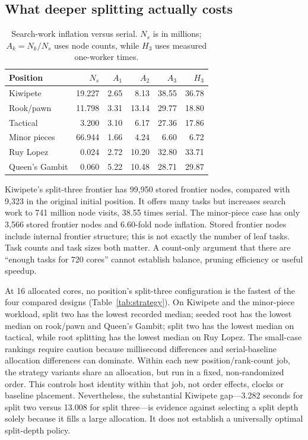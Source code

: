 \documentclass[11pt,a4paper]{article}
\begin{document}
\subsection{What deeper splitting actually costs}
\begin{table}[!htbp]\centering\small
\caption{Search-work inflation versus serial. $N_s$ is in millions;
$A_k=N_k/N_s$ uses node counts, while $H_3$ uses measured one-worker times.}
\label{tab:work}
\begin{tabular}{@{}lrrrrr@{}}\toprule
Position & $N_s$ & $A_1$ & $A_2$ & $A_3$ & $H_3$\\\midrule
Kiwipete & 19.227 & 2.65 & 8.13 & 38.55 & 36.78\\
Rook/pawn & 11.798 & 3.31 & 13.14 & 29.77 & 18.80\\
Tactical & 3.200 & 3.10 & 6.17 & 27.36 & 17.86\\
Minor pieces & 66.944 & 1.66 & 4.24 & 6.60 & 6.72\\
Ruy Lopez & 0.024 & 2.72 & 10.20 & 32.80 & 33.71\\
Queen's Gambit & 0.060 & 5.22 & 10.48 & 28.71 & 29.87\\
\bottomrule\end{tabular}\end{table}

Kiwipete's split-three frontier has 99,950 stored frontier nodes, compared with
9,323 in the original initial position. It offers many tasks but increases
search work to 741 million node visits, 38.55 times serial. The minor-piece
case has only 3,566 stored frontier nodes and 6.60-fold node inflation.
Stored frontier nodes include internal frontier structure; this is not exactly
the number of leaf tasks. Task counts and task sizes both matter. A count-only
argument that there are ``enough tasks for 720 cores'' cannot establish balance,
pruning efficiency or useful speedup.

At 16 allocated cores, no position's split-three configuration is the fastest
of the four compared designs (Table~\ref{tab:strategy}). On Kiwipete and the
minor-piece workload, split two has the lowest recorded median; seeded root has the lowest median
on rook/pawn and Queen's Gambit; split two has the lowest median on tactical,
while root splitting has the lowest median on Ruy Lopez. The small-case rankings require caution because millisecond differences
and serial-baseline allocation differences can dominate. Within each new
position/rank-count job, the strategy variants share an allocation, but run in
a fixed, non-randomized order. This controls host identity within that job, not
order effects, clocks or baseline placement. Nevertheless, the substantial
Kiwipete gap---3.282 seconds for split two versus 13.008 for split three---is evidence against selecting a split depth solely because it fills a large
allocation. It does not establish a universally optimal split-depth policy.
\end{document}
